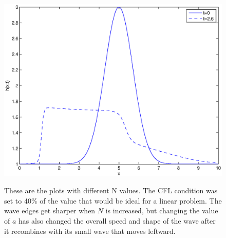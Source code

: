 \begin{enumerate}
\begin{enumerate}
\begin{figure}
{			\includegraphics[width=\hpage]{Figures/plot2p1_n_is_320_a_2.eps}}
			\caption{These are the plots with different N values.  The CFL condition was set to 40\% of the value that would be ideal for a linear problem. The wave edges get sharper when $N$ is increased, but changing the value of $a$ has also changed the overall speed and shape of the wave after it recombines with its small wave that moves leftward.} 
			\label{fig:Figure21d}
		\end{figure}
		
	\end{enumerate}
\end{enumerate}

